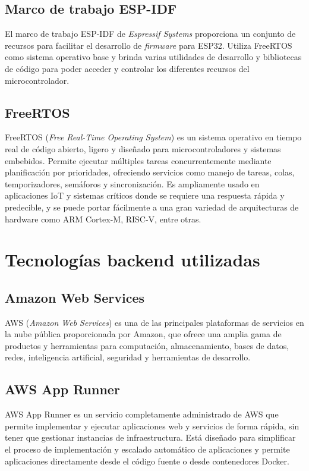 \subsection{Marco de trabajo ESP-IDF}

El marco de trabajo ESP-IDF de \textit{Espressif Systems} proporciona un conjunto de recursos para facilitar el desarrollo de \textit{firmware} para ESP32. Utiliza FreeRTOS como sistema operativo base y brinda varias utilidades de desarrollo y bibliotecas de código para poder acceder y controlar los diferentes recursos del microcontrolador.


\subsection{FreeRTOS}

FreeRTOS (\textit{Free Real-Time Operating System}) \citep{FreeRTOS} es un sistema operativo en tiempo real de código abierto, ligero y diseñado para microcontroladores y sistemas embebidos. Permite ejecutar múltiples tareas concurrentemente mediante planificación por prioridades, ofreciendo servicios como manejo de tareas, colas, temporizadores, semáforos y sincronización. Es ampliamente usado en aplicaciones IoT y sistemas críticos donde se requiere una respuesta rápida y predecible, y se puede portar fácilmente a una gran variedad de arquitecturas de hardware como ARM Cortex-M, RISC-V, entre otras.

\section{Tecnologías backend utilizadas}


\subsection{Amazon Web Services}

AWS (\textit{Amazon Web Services}) \citep{aws}  es una de las principales plataformas de servicios en la nube pública proporcionada por Amazon, que ofrece una amplia gama de productos y herramientas para computación, almacenamiento, bases de datos, redes, inteligencia artificial, seguridad y herramientas de desarrollo.


\subsection{AWS App Runner}

AWS App Runner \citep{aws_app_runner} es un servicio completamente administrado de AWS que permite implementar y ejecutar aplicaciones web y servicios de forma rápida, sin tener que gestionar instancias de infraestructura. Está diseñado para simplificar el proceso de implementación y escalado automático de aplicaciones y permite aplicaciones directamente desde el código fuente o desde contenedores Docker.



